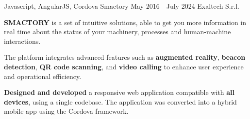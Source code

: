   \cventry
    {Javascript, AngularJS, Cordova} %
    {Smactory} %
    {May 2016 - July 2024} %
    {Exaltech S.r.l.} %
    {
      \begin{cvitems} %
        \item {\textbf{SMACTORY} is a set of intuitive solutions, able to get you more information in real time about the status of your machinery, processes and human-machine interactions.}
        \item {The platform integrates advanced features such as \textbf{augmented reality}, \textbf{beacon detection}, \textbf{QR code scanning}, and \textbf{video calling} to enhance user experience and operational efficiency.}  
        \item {\textbf{Designed and developed} a responsive web application compatible with \textbf{all devices}, using a single codebase. The application was converted into a hybrid mobile app using the Cordova framework.}  
      \end{cvitems}
    }
